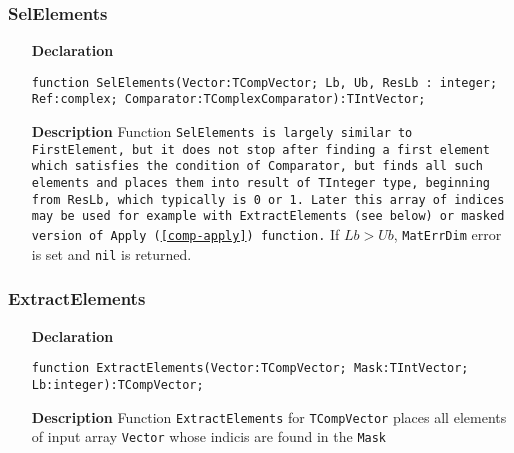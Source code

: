 \documentclass[12pt,a4paper,oneside]{report}
\newcommand{\declarationitem}[1]{\textbf{#1}}
\newcommand{\descriptiontitle}[1]{\textbf{#1}}
\newcommand{\code}[1]{\texttt{#1}}
\begin{document}
\subsubsection{SelElements}
\label{comp-selelements}
\begin{itemize}
	\item[\declarationitem{Declaration}\hfill]
	\begin{flushleft}
\code{function SelElements(Vector:TCompVector; Lb, Ub, ResLb : integer;
Ref:complex; Comparator:TComplexComparator):TIntVector;}	
	\end{flushleft}
	\item[\descriptiontitle{Description}]
	Function \code{SelElements is largely similar to \code{FirstElement}, but it does not stop after finding a first element which satisfies the condition of \code{Comparator}, but finds all such elements and places them into result of \code{TInteger} type, beginning from \code{ResLb}, which typically is \code{0} or \code{1}. Later this array of indices may be used for example with \code{ExtractElements} (see below) or masked version of \code{Apply} (\ref{comp-apply}) function.}  If $Lb > Ub$, \code{MatErrDim} error is set and \code{nil} is returned. 
\end{itemize}	
\subsubsection{ExtractElements}
\label{comp-extractelements}
\begin{itemize}
	\item[\declarationitem{Declaration}\hfill]
	\begin{flushleft}
\code{function ExtractElements(Vector:TCompVector; Mask:TIntVector; Lb:integer):TCompVector;}		
	\end{flushleft}
	\item[\descriptiontitle{Description}]
Function \code{ExtractElements} for \code{TCompVector} places all elements of input array \code{Vector}	whose indicis are found in the \code{Mask}
\end{itemize}	
\end{document}
